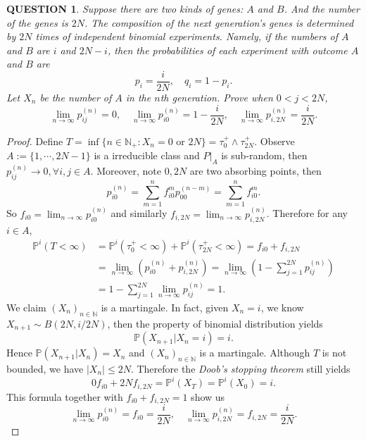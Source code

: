 \documentclass[12pt]{article}
\renewcommand{\(}{\left(}%
\renewcommand{\)}{\right)}%
\renewcommand{\[}{\left[}%
\renewcommand{\]}{\right]}%
\newcommand{\p}{\mathbb{P}}
\newcommand{\n}{\mathbb{N}}
\newtheorem{question}{QUESTION}[section]}
\newtheorem{proof}{Proof.}}
\begin{document}
  \begin{question}
  	Suppose there are two kinds of genes: $A$ and $B$. And the number of the genes is $2N$. The composition of the next generation's genes is determined by $2N$ times of independent binomial experiments. Namely, if the numbers of $A$ and $B$ are $i$ and $2N-i$, then the probabilities of each experiment with outcome $A$ and $B$ are
  	\begin{equation*}
  		p_i=\frac{i}{2N},\quad q_i=1-p_i.
  	\end{equation*} 
  	Let $X_n$ be the number of $A$ in the $n$th generation. Prove
  	when $0<j<2N$,
  		\begin{equation*}
  			\lim_{n\to\infty}p_{ij}^{(n)}=0,\quad \lim_{n\to\infty}p_{i0}^{(n)}=1-\frac{i}{2N},\quad \lim_{n\to\infty}p_{i,2N}^{(n)}=\frac{i}{2N}.
  		\end{equation*}
  \end{question}
  \begin{proof}
  	Define $T=\inf\{n\in\n_+:X_n=0\text{ or }2N\}=\tau_0^+\wedge \tau_{2N}^+$. Observe $A:=\{1,\cdots,2N-1\}$ is a irreducible class and $P|_A$ is sub-random, then $p_{ij}^{(n)}\to0,\forall i,j\in A$. Moreover, note $0,2N$ are two absorbing points, then 
  	\begin{equation*}
  		p_{i0}^{(n)}=\sum_{m=1}^n f_{i0}^{m}p_{00}^{(n-m)}=\sum_{m=1}^n f_{i0}^{m}.
  	\end{equation*}
  	So $f_{i0}=\lim_{n\to\infty}p_{i0}^{(n)}$ and similarly $f_{i,2N}=\lim_{n\to\infty}p_{i,2N}^{(n)}$.
  	Therefore for any $i\in A$,
  	\begin{equation*}
  		\begin{split}
  			\p^i(T<\infty)&=\p^i(\tau_0^+<\infty)+\p^i(\tau_{2N}^+<\infty)=f_{i0}+f_{i,2N}\\
  			&=\lim_{n\to\infty}\(p_{i0}^{(n)}+p_{i,2N}^{(n)}\)=\lim_{n\to\infty}\(1-\sum_{j=1}^{2N}p_{ij}^{(n)}\)\\
  			&=1-\sum_{j=1}^{2N}\lim_{n\to\infty}p_{ij}^{(n)}=1.
  		\end{split}
  	\end{equation*}
  	We claim $(X_n)_{n\in\n}$ is a martingale. In fact, given $X_n=i$, we know $X_{n+1}\sim B(2N,i/2N)$, then the property of binomial distribution yields
  	\begin{equation*}
  		\p(X_{n+1}|X_{n}=i)=i.
  	\end{equation*}
  	Hence $\p(X_{n+1}|X_n)=X_n$ and $(X_n)_{n\in\n}$ is a martingale. Although $T$ is not bounded, we have $|X_n|\leq 2N$. Therefore the {\itshape Doob's stopping theorem} still yields
  	\begin{equation*}
  		0f_{i0}+2Nf_{i,2N}=\p^i(X_T)=\p^i(X_0)=i.
  	\end{equation*}
  	This formula together with $f_{i0}+f_{i,2N}=1$ show us 
  	\begin{equation*}
  		\lim_{n\to\infty}p_{i0}^{(n)}=f_{i0}=\frac{i}{2N},\quad \lim_{n\to\infty}p_{i,2N}^{(n)}=f_{i,2N}=\frac{i}{2N}.
  	\end{equation*}
  \end{proof}
  
\end{document}
